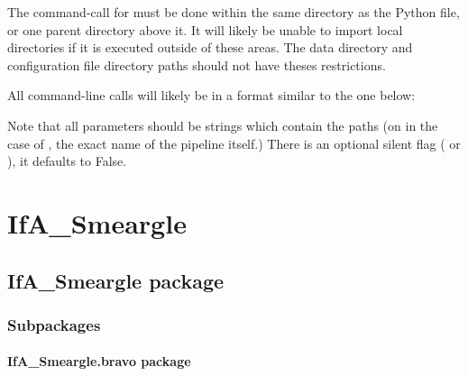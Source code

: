 \documentclass[letterpaper,10pt,english]{sphinxmanual}
\begin{document}
The command-call for  must be done within the same directory
as the Python file, or one parent directory above it. It will likely be unable
to import local directories if it is executed outside of these areas. The
data directory and configuration file directory paths should not have theses
restrictions.

All command-line calls will likely be in a format similar to the one below:

\begin{sphinxVerbatim}[commandchars=\\\{\}]
    
\end{sphinxVerbatim}

Note that all parameters should be strings which contain the paths (on in the
case of , the exact name of the pipeline itself.) There is
an optional silent flag ( or ), it defaults to False.


\chapter{IfA\_Smeargle}
\label{\detokenize{python_docstrings/modules:ifa-smeargle}}\label{\detokenize{python_docstrings/modules::doc}}

\section{IfA\_Smeargle package}
\label{\detokenize{python_docstrings/IfA_Smeargle:ifa-smeargle-package}}\label{\detokenize{python_docstrings/IfA_Smeargle::doc}}

\subsection{Subpackages}
\label{\detokenize{python_docstrings/IfA_Smeargle:subpackages}}

\subsubsection{IfA\_Smeargle.bravo package}
\label{\detokenize{python_docstrings/IfA_Smeargle.bravo:ifa-smeargle-bravo-package}}\label{\detokenize{python_docstrings/IfA_Smeargle.bravo::doc}}
\end{document}
